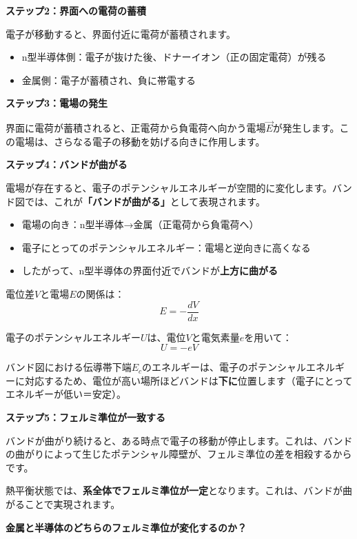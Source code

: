 \textbf{ステップ2：界面への電荷の蓄積}

電子が移動すると、界面付近に電荷が蓄積されます。
\begin{itemize}
\item n型半導体側：電子が抜けた後、ドナーイオン（正の固定電荷）が残る
\item 金属側：電子が蓄積され、負に帯電する
\end{itemize}

\textbf{ステップ3：電場の発生}

界面に電荷が蓄積されると、正電荷から負電荷へ向かう電場$\vec{E}$が発生します。この電場は、さらなる電子の移動を妨げる向きに作用します。

\textbf{ステップ4：バンドが曲がる}

電場が存在すると、電子のポテンシャルエネルギーが空間的に変化します。バンド図では、これが\textbf{「バンドが曲がる」}として表現されます。

\begin{itemize}
\item 電場の向き：n型半導体→金属（正電荷から負電荷へ）
\item 電子にとってのポテンシャルエネルギー：電場と逆向きに高くなる
\item したがって、n型半導体の界面付近でバンドが\textbf{上方に曲がる}
\end{itemize}

電位差$V$と電場$E$の関係は：
\begin{equation}
E = -\frac{dV}{dx}
\end{equation}

電子のポテンシャルエネルギー$U$は、電位$V$と電気素量$e$を用いて：
\begin{equation}
U = -eV
\end{equation}

バンド図における伝導帯下端$E_c$のエネルギーは、電子のポテンシャルエネルギーに対応するため、電位が高い場所ほどバンドは\textbf{下に}位置します（電子にとってエネルギーが低い＝安定）。

\textbf{ステップ5：フェルミ準位が一致する}

バンドが曲がり続けると、ある時点で電子の移動が停止します。これは、バンドの曲がりによって生じたポテンシャル障壁が、フェルミ準位の差を相殺するからです。

熱平衡状態では、\textbf{系全体でフェルミ準位が一定}となります。これは、バンドが曲がることで実現されます。

\textbf{金属と半導体のどちらのフェルミ準位が変化するのか？}

